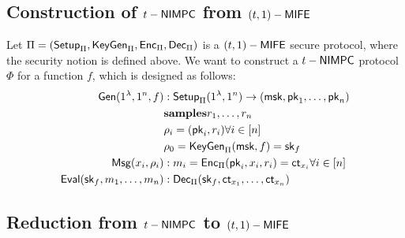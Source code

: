 \subsection{Construction of $t-\mathsf{NIMPC}$ from $(t,1)-\mathsf{MIFE}$}
Let $\Pi=(\mathsf{Setup}_{\Pi}, \mathsf{KeyGen}_{\Pi}, \mathsf{Enc}_{\Pi}, \mathsf{Dec}_{\Pi})$ is a $(t,1)-\mathsf{MIFE}$ secure protocol, where the security notion is defined above. We want to construct a $t-\mathsf{NIMPC}$ protocol $\Phi$ for a function $f$, which is designed as follows:
\begin{align*}
	\mathsf{Gen}(1^{\lambda},1^n,f) &:\mathsf{Setup}_{\Pi}(1^{\lambda},1^n) \rightarrow (\mathsf{msk}, \mathsf{pk}_1,\ldots, \mathsf{pk}_n)\\
		&\textbf{samples} r_1,\ldots,r_n\\
		&\rho_i = (\mathsf{pk}_i, r_i) \forall i\in [n]\\
		&\rho_0 = \mathsf{KeyGen}_{\Pi}(\mathsf{msk}, f)= \mathsf{sk}_f\\
	\mathsf{Msg}(x_i,\rho_i) &: m_i=\mathsf{Enc}_{\Pi}(\mathsf{pk}_i, x_i, r_i) = \mathsf{ct}_{x_i} \forall i\in[n]\\
	\mathsf{Eval}(\mathsf{sk}_f,m_1,\ldots,m_n) &: \mathsf{Dec}_{\Pi}(\mathsf{sk}_f, \mathsf{ct}_{x_1},\ldots, \mathsf{ct}_{x_n})\\
\end{align*}


\subsection{Reduction from $t-\mathsf{NIMPC}$ to $(t,1)-\mathsf{MIFE}$}

